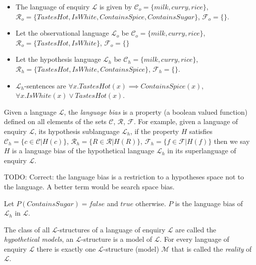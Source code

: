 \begin{exmp}
\begin{itemize}
\item The language of enquiry $\mathcal{L}$ is given by $\mathcal{C}_o=\{milk, curry, rice\}$,$\mathcal{R}_o=\{TastesHot, IsWhite, ContainsSpice, ContainsSugar\}$, $\mathcal{F}_o=\{\}$.
\item Let the observational language $\mathcal{L}_o$ be $\mathcal{C}_o=\{milk, curry, rice\}$,\\ $\mathcal{R}_o=\{TastesHot, IsWhite\}$, $\mathcal{F}_o=\{\}$
\item Let the hypothesis language $\mathcal{L}_h$ be $\mathcal{C}_h=\{milk, curry, rice\}$,\\ $\mathcal{R}_h=\{TastesHot, IsWhite, ContainsSpice\}$, $\mathcal{F}_h=\{\}$.
\item $\mathcal{L}_h$-sentences are $\forall x. TastesHot(x) \implies ContainsSpice(x)$,\\ $\forall x. IsWhite(x) \lor TastesHot(x)$.
\end{itemize}
\end{exmp}

\begin{defn}
Given a language $\mathcal{L}$, the \emph{language bias} is a property (a boolean valued function) defined on all elements of the sets $\mathcal{C}$, $\mathcal{R}$, $\mathcal{F}$. For example, given a language of enquiry $\mathcal{L}$, its hypothesis sublanguage $\mathcal{L}_h$, if the property $H$ satisfies $\mathcal{C}_h=\{c \in \mathcal{C} | H(c)\}$, $\mathcal{R}_h=\{R \in \mathcal{R} | H(R)\}$, $\mathcal{F}_h=\{f \in \mathcal{F} | H(f)\}$ then we say $H$ is a language bias of the hypothetical language $\mathcal{L}_h$ in its superlanguage of enquiry $\mathcal{L}$.
\end{defn}
TODO: Correct: the language bias is a restriction to a hypotheses space not to the language. A better term would be search space bias.

\begin{exmp}
Let $P(ContainsSugar)=false$ and $true$ otherwise. $P$ is the language bias of $\mathcal{L}_h$ in $\mathcal{L}$.
\end{exmp}

\begin{defn}
The class of all $\mathcal{L}$-structures of a language of enquiry $\mathcal{L}$ are called the \emph{hypothetical models}, an $\mathcal{L}$-structure is a model of $\mathcal{L}$. For every language of enquiry $\mathcal{L}$ there is exactly one $\mathcal{L}$-structure (model) $\mathcal{M}$ that is called the \emph{reality} of $\mathcal{L}$.
\end{defn}

